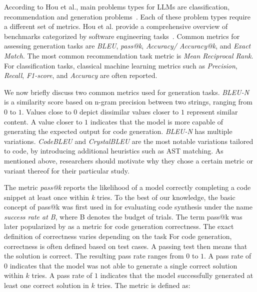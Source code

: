 According to Hou et al., main problems types for LLMs are classification, recommendation and generation problems~\cite{10.1145/3695988}.
Each of these problem types require a different set of metrics.
 Hou et al. provide a comprehensive overview of benchmarks categorized by software engineering tasks~\cite{10.1145/3695988}.
Common metrics for assessing generation tasks are \emph{BLEU}, \emph{pass@k}, \emph{Accuracy/ Accuracy@k}, and \emph{Exact Match}.
The most common recommendation task metric is \emph{Mean Reciprocal Rank}.
For classification tasks, classical machine learning metrics such as \emph{Precision}, \emph{Recall}, \emph{F1-score}, and \emph{Accuracy} are often reported.

We now briefly discuss two common metrics used for generation tasks.
\emph{BLEU-N} \cite{DBLP:conf/acl/PapineniRWZ02} is a similarity score based on n-gram precision between two strings, ranging from $0$ to $1$.
Values close to $0$ depict dissimilar values closer to $1$ represent similar content.
A value closer to $1$ indicates that the model is more capable of generating the expected output for code generation.
\emph{BLEU-N} has multiple variations.
\emph{CodeBLEU} \cite{DBLP:journals/corr/abs-2009-10297} and \emph{CrystalBLEU} \cite{DBLP:conf/kbse/EghbaliP22} are the most notable variations tailored to code, by introducing additional heuristics such as AST matching.
As mentioned above, researchers should motivate why they chose a certain metric or variant thereof for their particular study.

The metric \emph{pass@k} reports the likelihood of a model correctly completing a code snippet at least once within \emph{k} tries.
To the best of our knowledge, the basic concept of pass@k was first used in \cite{DBLP:journals/corr/abs-1906-04908} for evaluating code synthesis under the name \emph{success rate at B}, where B denotes the budget of trials.
The term pass@k was later popularized by \cite{DBLP:journals/corr/abs-2107-03374} as a metric for code generation correctness.
The exact definition of correctness varies depending on the task
For code generation, correctness is often defined based on test cases. A passing test then means that the solution is correct.
The resulting pass rate ranges from $0$ to $1$.
A pass rate of $0$ indicates that the model was not able to generate a single correct solution within $k$ tries.
A pass rate of $1$ indicates that the model successfully generated at least one correct solution in $k$ tries.
The metric is defined as:

